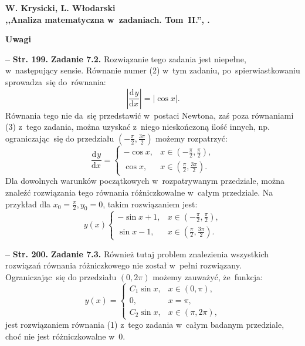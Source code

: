 \documentclass[a4paper,11pt]{article}
\newcommand{\spaceOne}{2em}
\newcommand{\fr}{\frac}
\newcommand{\mr}{\mathrm}
\newcommand{\de}{\mr{d}}
\newcommand{\dd}[3]{\fr{ \de^{ #1 } { #2 } }{ \de { #3 }^{ #1 } } }
\newcommand{\tb}{\textbf}
\newcommand{\noi}{\noindent}
\newcommand{\start}{\noi \tb{--} {}}
\newcommand{\Center}[1]{\begin{center} #1 \end{center}}
\newcommand{\CenterTB}[1]{\Center{\tb{#1}}}
\newcommand{\Str}[1]{\tb{Str. #1.}}
\newcommand{\Work}[1]{ \begin{center} {\large \tb{#1} } \end{center} }
\providecommand{\abs}[1]{\lvert #1 \rvert}
\begin{document}
\vspace{\spaceOne}



\Work{
  W. Krysicki, L. Włodarski\\
  ,,Analiza matematyczna w~zadaniach. Tom~II.'', \cite{KW04}. }


\CenterTB{Uwagi}

\start \Str{199} \tb{Zadanie 7.2.} Rozwiązanie tego zadania jest
niepełne, w~następujący sensie. Równanie numer (2) w~tym zadaniu,
po~spierwiastkowaniu sprowadza~się do~równania:
\begin{equation*}\label{eq:II-1}
  \left| \dd{}{ y }{ x } \right| = \abs{ \cos x }.
\end{equation*}
Równania tego nie da~się przedstawić w~postaci Newtona, zaś poza
równaniami (3) z~tego zadania, można uzyskać z~niego nieskończoną
ilość innych, np. ograniczając~się do przedziału
$( -\fr{ \pi }{ 2 }, \frac{ 3 \pi }{ 2 })$ możemy rozpatrzyć:
\begin{equation*}
  \dd{}{ y }{ x } =
  \begin{cases}
    -\cos x,& x \in ( -\fr{ \pi }{ 2 }, \fr{ \pi }{ 2 } ), \\
    \cos x,& x \in ( \fr{ \pi }{ 2 }, \fr{ 3 \pi }{ 2 } ).
  \end{cases}
\end{equation*}
Dla dowolnych warunków początkowych w~rozpatrywanym przedziale, można
znaleźć rozwiązania tego równania różniczkowalne w~całym przedziale.
Na przykład dla $x_{ 0 } = \fr{ \pi }{ 2 }, y_{ 0 } = 0$, takim
rozwiązaniem jest:
\begin{equation*}
  y( x )
  \begin{cases}
    -\sin x + 1,& x \in ( -\fr{ \pi }{ 2 }, \fr{ \pi }{ 2 } ), \\
    \sin x - 1,& x \in ( \fr{ \pi }{ 2 }, \fr{ 3 \pi }{ 2 } ).
  \end{cases}
\end{equation*}

\start \Str{200} \tb{Zadanie 7.3.} Również tutaj problem znalezienia
wszystkich rozwiązań równania różniczkowego nie został w~pełni
rozwiązany. Ograniczając~się do przedziału $( 0, 2 \pi )$ możemy
zauważyć, że~funkcja:
\begin{equation*}
  y( x ) =
  \begin{cases}
    C_{ 1 } \sin x,& x \in ( 0, \pi ), \\
    0, & x = \pi, \\
    C_{ 2 } \sin x,& x \in ( \pi, 2 \pi ),
  \end{cases}
\end{equation*}
jest rozwiązaniem równania (1) z~tego zadania w~całym badanym
przedziale, choć nie jest różniczkowalne w~0.
\end{document}
